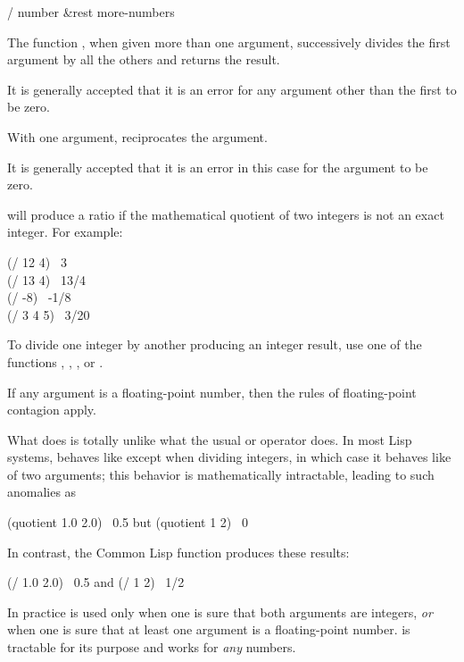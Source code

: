 \begin{defun}[Function]
/ number &rest more-numbers

The function \cd{/}, when given more than one argument, successively divides
the first argument by all the others and returns the result.

\begin{new}%
It is generally accepted that it is an error for any argument other than the
first to be zero.
\end{new}

With one argument, \cd{/} reciprocates the argument.

\begin{new}%
It is generally accepted that it is an error in this case for the argument
to be zero.
\end{new}

\cd{/} will produce a ratio if the mathematical quotient of two integers
is not an exact integer.  For example:
\begin{lisp}
(/ 12 4) \EV\ 3 \\
(/ 13 4) \EV\ 13/4 \\
(/ -8) \EV\ -1/8 \\
(/ 3 4 5) \EV\ 3/20
\end{lisp}
To divide one integer by another producing an integer result,
use one of the functions , , ,
or .

If any argument is a floating-point number,
then the rules of floating-point contagion apply.

\beforenoterule
\begin{incompatibility}
What \cd{/} does is totally unlike what the usual
\cd{//} or  operator does.  In most Lisp systems,
 behaves like \cd{/} except when dividing integers,
in which case it behaves like  of two arguments;
this behavior is mathematically intractable, leading to such
anomalies as
\begin{lisp}
(quotient 1.0 2.0) \EV\ 0.5   {\rm but}   (quotient 1 2) \EV\ 0
\end{lisp}
In contrast, the Common Lisp function \cd{/} produces these results:
\begin{lisp}
(/ 1.0 2.0) \EV\ 0.5          {\rm and}   (/ 1 2) \EV\ 1/2
\end{lisp}
In practice  is used only when one is sure that both arguments
are integers, {\it or} when one is sure that at least one argument
is a floating-point number.  \cd{/} is tractable for its purpose
and works for {\it any} numbers.
\end{incompatibility}
\afternoterule
\end{defun}

